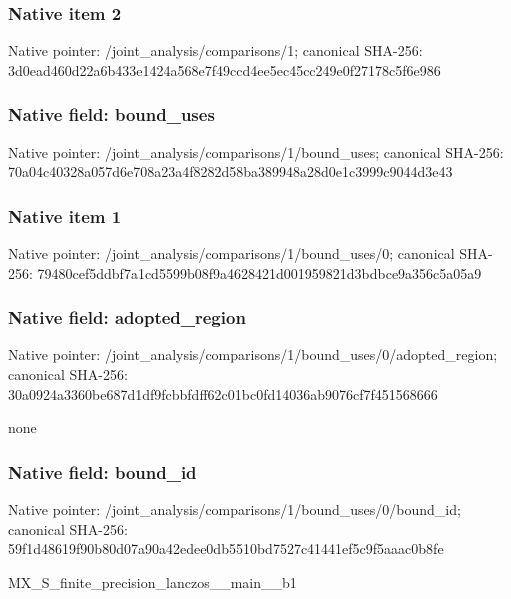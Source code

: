 \documentclass[10pt,a4paper]{article}
\begin{document}
\subsubsection{Native item 2}
Native pointer: /joint\_\allowbreak{}analysis/comparisons/1; canonical SHA-256: 3d0ead460d22a6b433e1424a568e7f49ccd4ee5ec45cc249e0f27178c5f6e986

\subsubsection{Native field: bound\_\allowbreak{}uses}
Native pointer: /joint\_\allowbreak{}analysis/comparisons/1/bound\_\allowbreak{}uses; canonical SHA-256: 70a04c40328a057d6e708a23a4f8282d58ba389948a28d0e1c3999c9044d3e43

\subsubsection{Native item 1}
Native pointer: /joint\_\allowbreak{}analysis/comparisons/1/bound\_\allowbreak{}uses/0; canonical SHA-256: 79480cef5ddbf7a1cd5599b08f9a4628421d001959821d3bdbce9a356c5a05a9

\subsubsection{Native field: adopted\_\allowbreak{}region}
Native pointer: /joint\_\allowbreak{}analysis/comparisons/1/bound\_\allowbreak{}uses/0/adopted\_\allowbreak{}region; canonical SHA-256: 30a0924a3360be687d1df9fcbbfdff62c01bc0fd14036ab9076cf7f451568666

\begingroup\raggedright\sloppy none\par\endgroup

\subsubsection{Native field: bound\_\allowbreak{}id}
Native pointer: /joint\_\allowbreak{}analysis/comparisons/1/bound\_\allowbreak{}uses/0/bound\_\allowbreak{}id; canonical SHA-256: 59f1d48619f90b80d07a90a42edee0db5510bd7527c41441ef5c9f5aaac0b8fe

\begingroup\raggedright\sloppy MX\_\allowbreak{}S\_\allowbreak{}finite\_\allowbreak{}precision\_\allowbreak{}lanczos\_\allowbreak{}\_\allowbreak{}main\_\allowbreak{}\_\allowbreak{}b1\par\endgroup
\end{document}
